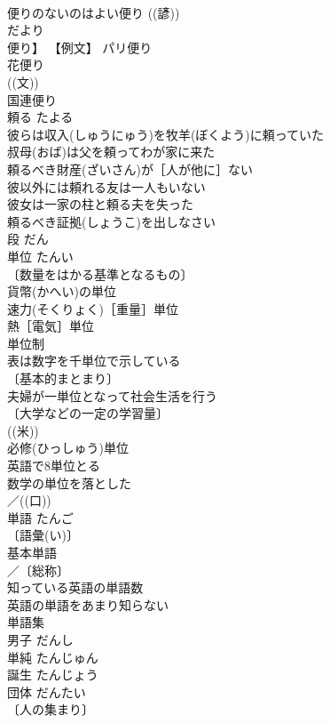 \documentclass[8pt]{extreport}
\begin{document}
\begin{CJK}{UTF8}{min}
\\	便りのないのはよい便り ((諺)) 
\\	だより
\\	便り】 【例文】 パリ便り 
\\	花便り 
\\	((文)) 
\\	国連便り 
\\	頼る	たよる	
\\	彼らは収入(しゅうにゅう)を牧羊(ぼくよう)に頼っていた 
\\	叔母(おば)は父を頼ってわが家に来た 
\\	頼るべき財産(ざいさん)が［人が他に］ない 
\\	彼以外には頼れる友は一人もいない 
\\	彼女は一家の柱と頼る夫を失った 
\\	頼るべき証拠(しょうこ)を出しなさい 
\\	段	だん	
\\	単位	たんい	
\\	〔数量をはかる基準となるもの〕
\\	貨幣(かへい)の単位 
\\	速力(そくりょく)［重量］単位 
\\	熱［電気］単位 
\\	単位制 
\\	表は数字を千単位で示している 
\\	〔基本的まとまり〕
\\	夫婦が一単位となって社会生活を行う 
\\	〔大学などの一定の学習量〕
\\	((米)) 
\\	必修(ひっしゅう)単位 
\\	英語で8単位とる 
\\	数学の単位を落とした 
\\	／((口)) 
\\	単語	たんご	
\\	〔語彙(い)〕
\\	基本単語 
\\	／〔総称〕
\\	知っている英語の単語数 
\\	英語の単語をあまり知らない 
\\	単語集 
\\	男子	だんし	
\\	単純	たんじゅん	
\\	誕生	たんじょう	
\\	団体	だんたい	
\\	〔人の集まり〕

\end{CJK}
\end{document}
